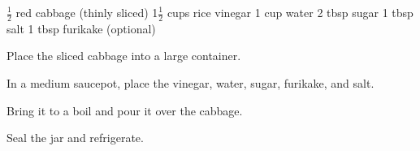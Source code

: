 \dishtype{\pickle}
\dishother{\vegetarian}
\begin{ingreds}
    $\frac{1}{2}$ red cabbage (thinly sliced)
    1$\frac{1}{2}$ cups rice vinegar
    1 cup water
    2 tbsp sugar
    1 tbsp salt
    1 tbsp furikake (optional)
\end{ingreds}
\begin{method}
    Place the sliced cabbage into a large container.\par
    In a medium saucepot, place the vinegar, water, sugar, furikake, and salt.\par
    Bring it to a boil and pour it over the cabbage.\par
    Seal the jar and refrigerate.
\end{method}